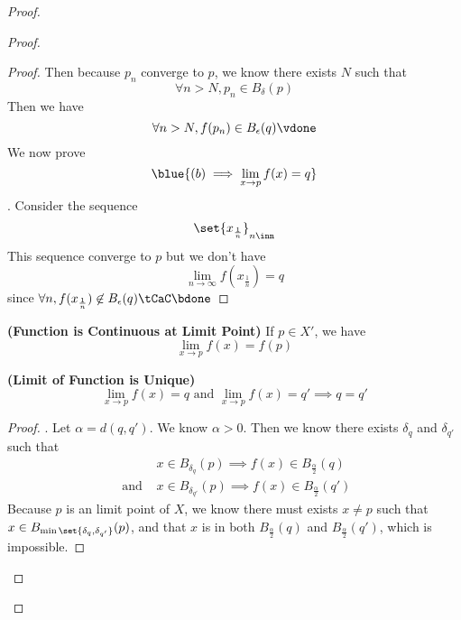 \documentclass{report}
\begin{document}
\begin{proof}
\begin{proof}
\begin{proof}
Then because $p_n$ converge to $p$, we know there exists  $N$ such that 
\begin{equation*}
\forall n>N, p_n\in B_{\delta }(p)
\end{equation*}
Then we have 
\begin{equation*}
\forall n>N,f(p_n)\in B_\epsilon (q)\vdone
\end{equation*}
We now prove 
\begin{equation*}
\blue{(b)\implies \lim_{x\to p}f(x)=q}
\end{equation*}
. Consider the sequence 
\begin{equation*}
\set{x_{\frac{1}{n}}}_{n\inn}
\end{equation*}
This sequence converge to $p$ but we don't have 
\begin{equation*}
\lim_{n\to\infty}f(x_{\frac{1}{n}})=q
\end{equation*}
since $\forall n, f(x_{\frac{1}{n}})\not\in B_\epsilon (q)\tCaC\bdone$ 
\end{proof}
\begin{corollary}
\label{3.11.3}
\textbf{(Function is Continuous at Limit Point)} If $p\in X'$, we have
\begin{equation*}
\lim_{x\to p}f(x)=f(p)
\end{equation*}
\end{corollary}
\begin{theorem}
\label{3.11.4}
\textbf{(Limit of Function is Unique)} 
\begin{equation*}
\lim_{x\to p}f(x)=q\text{ and }\lim_{x \to p}f(x)=q'\implies q=q'
\end{equation*}
\end{theorem}
\begin{proof}
. Let $\alpha =d(q,q')$. We know $\alpha >0$. Then we know there exists $\delta_q$ and $\delta_{q'}$ such that 
\begin{align}
&x\in B_{\delta_q}(p)\implies f(x)\in B_{\frac{\alpha}{2}}(q)\\
\text{ and }&x\in B_{\delta_{q'}}(p)\implies f(x)\in B_{\frac{\alpha}{2}} (q')
\end{align}
Because $p$ is an limit point of $X$, we know there must exists $x\neq p$ such that $x\in B_{\min \set{\delta_q,\delta_{q'}}}(p)$, and that $x$ is in both $B_{\frac{\alpha }{2}}(q)$ and $B_{\frac{\alpha}{2}}(q')$, which is impossible. \CaC
\end{proof}

\end{proof}
\end{proof}
\end{document}
